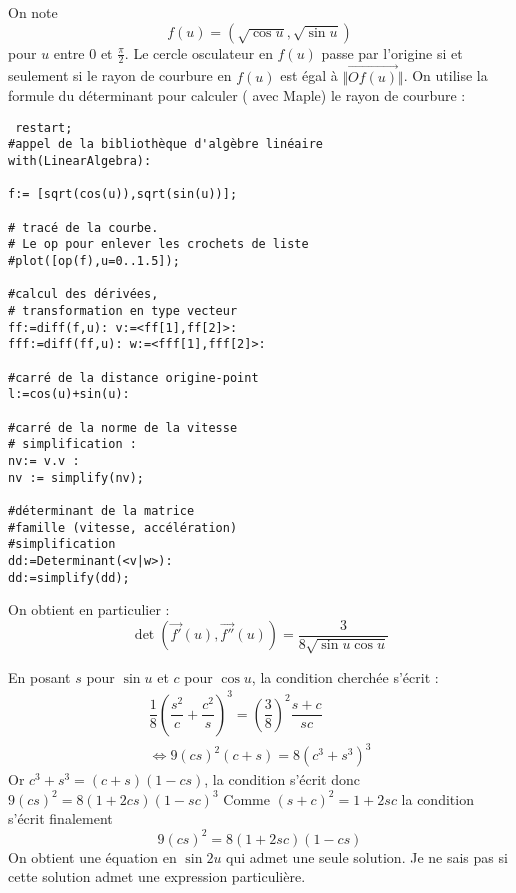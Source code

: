 On note 
\begin{displaymath}
 f(u) = (\sqrt{\cos u }, \sqrt{\sin u })
\end{displaymath}
pour $u$ entre $0$ et $\frac{\pi}{2}$. Le cercle osculateur en $f(u)$ passe par l'origine si et seulement si le rayon de courbure en $f(u)$ est égal à $\Vert \overrightarrow{Of(u)}\Vert$.\newline
On utilise la formule du déterminant pour calculer ( avec Maple) le rayon de courbure :
\begin{verbatim}
 restart;
#appel de la bibliothèque d'algèbre linéaire
with(LinearAlgebra):

f:= [sqrt(cos(u)),sqrt(sin(u))];

# tracé de la courbe.
# Le op pour enlever les crochets de liste
#plot([op(f),u=0..1.5]);

#calcul des dérivées,
# transformation en type vecteur  
ff:=diff(f,u): v:=<ff[1],ff[2]>:
fff:=diff(ff,u): w:=<fff[1],fff[2]>:

#carré de la distance origine-point
l:=cos(u)+sin(u):

#carré de la norme de la vitesse
# simplification :
nv:= v.v :
nv := simplify(nv);

#déterminant de la matrice 
#famille (vitesse, accélération)
#simplification
dd:=Determinant(<v|w>):
dd:=simplify(dd);
\end{verbatim} 

On obtient en particulier :
\begin{displaymath}
 \det(\overrightarrow{f'}(u),\overrightarrow{f''}(u))
=\dfrac{3}{8\sqrt{\sin u \cos u}}
\end{displaymath}

En posant $s$ pour $\sin u$ et $c$ pour $\cos u$, la condition cherchée s'écrit :
\begin{multline*}
 \dfrac{1}{8}\left(\dfrac{s^2}{c}+\dfrac{c^2}{s} \right)^3=
 \left( \dfrac{3}{8}\right)^2\dfrac{s+c}{sc} \\
\Leftrightarrow
9(cs)^2(c+s)=8(c^3+s^3)^3 
\end{multline*}
Or $c^3+s^3 = (c+s)(1-cs)$, la condition s'écrit donc
$9(cs)^2 = 8 (1+2cs)(1-sc)^3$ Comme $(s+c)^2 = 1+2sc$ la condition s'écrit finalement
\begin{displaymath}
 9(cs)^2=8(1+2sc)(1-cs)
\end{displaymath}
On obtient une équation en $\sin 2u$ qui admet une seule solution. Je ne sais pas si cette solution admet une expression particulière.
